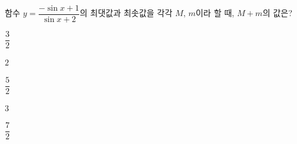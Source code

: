 함수 $y=\dfrac{-\sin x+1}{\sin x+2}$의 최댓값과 최솟값을 각각 $M$, $m$이라 할 때, $M+m$의 값은?
\begin{choices32}{\rule[-3ex]{0pt}{8ex}$\dfrac{3}{2}$}{\rule[-3ex]{0pt}{8ex}$2$}{\rule[-3ex]{0pt}{8ex}$\dfrac{5}{2}$}{\rule[-3ex]{0pt}{8ex}$3$}{\rule[-3ex]{0pt}{8ex}$\dfrac{7}{2}$}\end{choices32}
